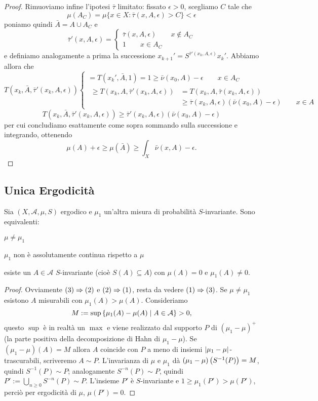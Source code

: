 \begin{proof}
Rimuoviamo infine l'ipotesi $\bar\tau$ limitato: fissato $\epsilon>0$, scegliamo $C$ tale che
\[\mu(A_C)=\mu\{x\in X: \bar\tau(x,A,\epsilon)>C\}<\epsilon\]
poniamo quindi $\bar A=A\cup A_C$ e
\[\bar\tau'(x,A,\epsilon)=\begin{cases}\bar\tau(x,A,\epsilon) \qquad x\notin A_C\\
					1 \qquad x\in A_C
  \end{cases}\]
e definiamo analogamente a prima la successione $x_{k+1}'=S^{\bar\tau'(x_k,A,\epsilon)}x_k'$. Abbiamo allora che
\[T(x_k,\bar A,\bar\tau'(x_k,A,\epsilon))
    \begin{cases} =T(x_k',\bar A,1)=1\geq \bar\nu(x_0,A)-\epsilon \qquad x\in A_C \\
		  \begin{aligned}\geq T(x_k,A,\bar\tau'(x_k,A,\epsilon))&=T(x_k,A,\bar\tau(x_k,A,\epsilon))\\
			&\geq \bar\tau(x_k,A,\epsilon)(\bar\nu(x_0,A)-\epsilon) \qquad x\in A \end{aligned}
    \end{cases}\]
\[T(x_k,\bar A,\bar\tau'(x_k,A,\epsilon))\geq \bar\tau'(x_k,A,\epsilon)(\bar\nu(x_0,A)-\epsilon)\]
per cui concludiamo esattamente come sopra sommando sulla successione e integrando, ottenendo
\[\mu(A)+\epsilon\geq\mu(\bar A)\geq \int_X \bar\nu(x,A)-\epsilon.\]
\end{proof}

\subsection{Unica Ergodicità}

\begin{teo}Sia $(X,\mathcal{A},\mu,S)$ ergodico e $\mu_1$ un'altra misura di probabilità $S$-invariante.
Sono equivalenti:
\begin{lista}
\item $\mu\neq\mu_1$
\item $\mu_1$ non è assolutamente continua rispetto a $\mu$
\item esiste un $A\in\mathcal{A}$ $S$-invariante (cioè $S(A)\subseteq A$) con $\mu(A)=0$ e $\mu_1(A)\neq 0$.
\end{lista}
\end{teo}

\begin{proof}Ovviamente $(3)\Rightarrow (2)$ e $(2)\Rightarrow (1)$, resta da vedere $(1)\Rightarrow (3)$.
Se $\mu\neq\mu_1$ esistono $A$ misurabili con $\mu_1(A)>\mu(A)$. Consideriamo 
\[M:=\sup\left\{\mu_1(A)-\mu(A)\mid A\in\mathcal{A}\right\}>0,\]
questo $\sup$ è in realtà un $\max$ e viene realizzato dal supporto $P$ di $(\mu_1-\mu)^+$ (la parte positiva della decomposizione di Hahn di $\mu_1-\mu$). 
Se $(\mu_1-\mu)(A)=M$ allora $A$ coincide con $P$ a meno di insiemi $\left|\mu_1-\mu\right|$-trascurabili, scriveremo $A\sim P$.
L'invarianza di $\mu$ e $\mu_1$ dà $(\mu_1-\mu)\left(S^{-1}(P)\right)=M$, quindi $S^{-1}(P)\sim P$; analogamente $S^{-n}(P)\sim P$,
quindi $P':=\bigcup_{n\ge 0}S^{-n}(P)\sim P$. L'insieme $P'$ è $S$-invariante e $1\ge \mu_1(P')>\mu(P')$, perciò per ergodicità di $\mu$, $\mu(P')=0$.
\end{proof}

